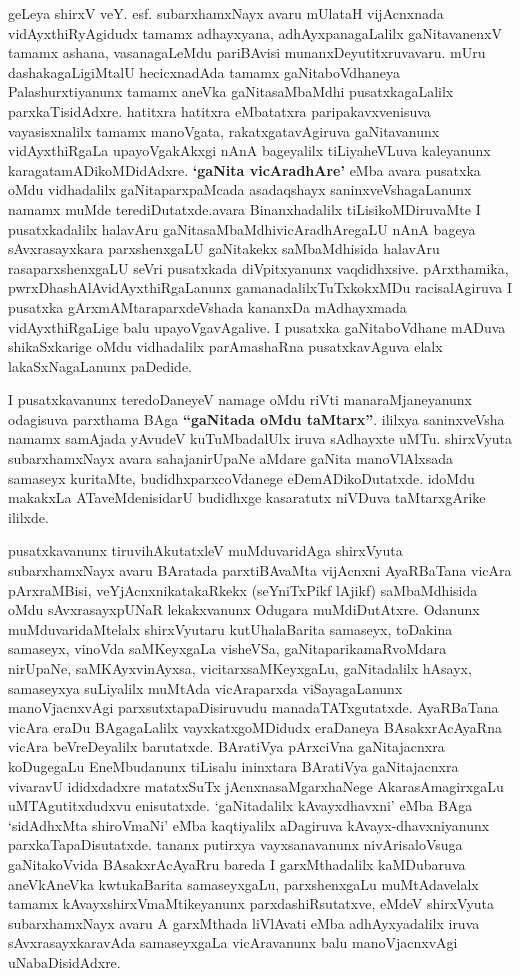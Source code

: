 geLeya shirxV veY. esf. subarxhamxNayx avaru mUlataH vijAcnxnada vidAyxthiRyAgidudx tamamx adhayxyana, adhAyxpanagaLalilx gaNitavanenxV tamamx ashana, vasanagaLeMdu pariBAvisi\- munanxDeyutitxruvavaru. mUru dashakagaLigiMtalU hecicxnadAda tamamx gaNitaboVdha\-neya Palashurxtiyanunx tamamx aneVka gaNitasaMbaMdhi pusatxkagaLalilx parxkaTisidAdxre. hatitxra hatitxra eMbatatxra paripakavxvenisuva vayasisxnalilx tamamx manoVgata, rakatxgatavAgiruva gaNitavanunx vidAyxthiRgaLa upayoVgakAkxgi nAnA bageyalilx tiLiyaheVLuva kale\-yanunx karagatamADikoMDidAdxre. {\bf `gaNita vicAradhAre'} eMba avara pusatxka oMdu vidhadalilx gaNitaparxpaMcada asadaqshayx saninxveVshagaLanunx namamx muMde terediDutatxde.\break avara Binanxhadalilx tiLisikoMDiruvaMte I pusatxkadalilx halavAru gaNitasaMbaMdhi\break vicAradhAregaLU nAnA bageya sAvxrasayxkara parxshenxgaLU gaNitakekx saMbaMdhisida hala\-vAru rasaparxshenxgaLU seVri pusatxkada diVpitxyanunx vaqdidhxsive. pArxthamika, pwrxDhashAlA\-vidAyxthiRgaLanunx gamanadalilxTuTxkokxMDu racisalAgiruva I pusatxka gArxmAMtara\break parxdeVshada kananxDa mAdhayxmada vidAyxthiRgaLige balu upayoVgavAgalive. I pusatxka gaNitaboVdhane mADuva shikaSxkarige oMdu vidhadalilx parAmashaRna pusatxkavAguva elalx lakaSxNagaLanunx paDedide.

\bigskip

I pusatxkavanunx teredoDaneyeV namage oMdu riVti manaraMjaneyanunx odagisuva parxthama BAga {\bf ``gaNitada oMdu taMtarx''}. ililxya saninxveVsha namamx samAjada yAvudeV kuTuMbadalUlx iruva sAdhayxte uMTu. shirxVyuta subarxhamxNayx avara sahajanirUpaNe aMdare gaNita manoVlAlxsada samaseyx kuritaMte, budidhxparxcoVdanege eDemADikoDutatxde. idoMdu makakxLa ATaveMdenisidarU budidhxge kasaratutx niVDuva taMtarxgArike ililxde.

\bigskip

pusatxkavanunx tiruvihAkutatxleV muMduvaridAga shirxVyuta subarxhamxNayx avaru BAratada parxtiBAvaMta vijAcnxni AyaRBaTana vicAra pArxraMBisi, veYjAcnxnikatakaRkekx (seYniTxPikf lAjikf) saMbaMdhisida oMdu sAvxrasayxpUNaR lekakxvanunx Odugara muMdiDutAtxre. Odanunx muMduvaridaMtelalx shirxVyutaru kutUhalaBarita samaseyx, toDakina samaseyx, vinoVda saMKeyxgaLa visheVSa, gaNitaparikamaRvoMdara nirUpaNe, saMKAyxvinAyxsa, vicitarxsaMKeyxgaLu, gaNitadalilx hAsayx, samaseyxya suLiyalilx muMtAda vicAraparxda viSayagaLanunx manoVjacnxvAgi parxsutxtapaDisiruvudu manadaTATxgutatxde. AyaRBaTana vicAra eraDu BAgagaLalilx vayxkatxgoMDidudx eraDaneya BAsakxrAcAyaRna vicAra beVreDeyalilx barutatxde. BAratiVya pArxciVna gaNitajacnxra koDugegaLu EneMbudanunx tiLisalu ininxtara BAratiVya gaNitajacnxra vivaravU ididxdadxre matatxSuTx jAcnxnasaMgarxhaNege AkarasAmagirxgaLu uMTAgutitxdudxvu enisutatxde. `gaNitadalilx kAvayxdhavxni' eMba BAga `sidAdhxMta shiroVmaNi' eMba kaqtiyalilx aDagiruva kAvayx-dhavxniyanunx parxkaTapaDisutatxde. tananx putirxya vayxsanavanunx nivArisaloVsuga gaNitakoVvida BAsakxrAcAyaRru bareda I garxMthadalilx kaMDubaruva aneVkAneVka kwtukaBarita samaseyxgaLu, parxshenxgaLu muMtAdavelalx tamamx kAvayxshirxVmaMtikeyanunx parxdashiRsutatxve, eMdeV shirxVyuta subarxhamxNayx avaru A garxMthada liVlAvati eMba adhAyxyadalilx iruva sAvxrasayxkaravAda samaseyxgaLa vicAravanunx balu manoVjacnxvAgi uNabaDisidAdxre.

